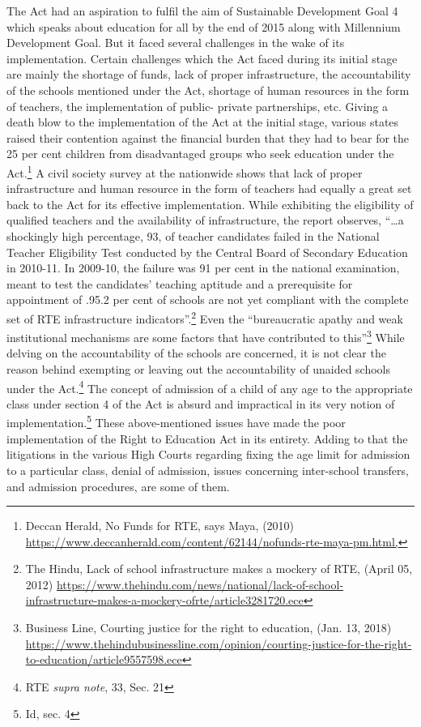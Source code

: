 \begin{multicols}{2}
\vspace{-.1cm}

\noi
The Act had an aspiration to fulfil the aim of Sustainable Development Goal 4 which speaks
about education for all by the end of 2015 along with Millennium Development Goal. But it
faced several challenges in the wake of its implementation. Certain challenges which the Act
faced during its initial stage are mainly the shortage of funds, lack of proper infrastructure,
the accountability of the schools mentioned under the Act, shortage of human resources in the
form of teachers, the implementation of public- private partnerships, etc. Giving a death blow
to the implementation of the Act at the initial stage, various states raised their contention
against the financial burden that they had to bear for the 25 per cent children from
disadvantaged groups who seek education under the Act.\footnote{Deccan Herald, No Funds for RTE, says Maya, (2010) \url{https://www.deccanherald.com/content/62144/nofunds-rte-maya-pm.html,}} A civil society survey at the
nationwide shows that lack of proper infrastructure and human resource in the form of
teachers had equally a great set back to the Act for its effective implementation. While
exhibiting the eligibility of qualified teachers and the availability of infrastructure, the report
observes, “…a shockingly high percentage, 93, of teacher candidates failed in the National 
Teacher Eligibility Test conducted by the Central Board of Secondary Education in 2010-11.
In 2009-10, the failure was 91 per cent in the national examination, meant to test the
candidates' teaching aptitude and a prerequisite for appointment of .95.2 per cent of schools
are not yet compliant with the complete set of RTE infrastructure indicators”.\footnote{The Hindu, Lack of school infrastructure makes a mockery of RTE, (April 05, 2012)   \url{https://www.thehindu.com/news/national/lack-of-school-infrastructure-makes-a-mockery-ofrte/article3281720.ece}} Even the “bureaucratic apathy and weak institutional mechanisms are some factors that have
contributed to this”\footnote{Business Line, Courting justice for the right to education, (Jan. 13, 2018)
 \url{https://www.thehindubusinessline.com/opinion/courting-justice-for-the-right-to-education/article9557598.ece}} While delving on the accountability of the schools are concerned, it is
not clear the reason behind exempting or leaving out the accountability of unaided schools
under the Act.\footnote{RTE \textit{supra note}, 33, Sec. 21} The concept of admission of a child of any age to the appropriate class under section 4 of the Act is absurd and impractical in its very notion of implementation.\footnote{ Id, sec. 4} These above-mentioned issues have made the poor implementation of the Right to Education Act in
its entirety. Adding to that the litigations in the various High Courts regarding fixing the age
limit for admission to a particular class, denial of admission, issues concerning inter-school
transfers, and admission procedures, are some of them.


\end{multicols}
